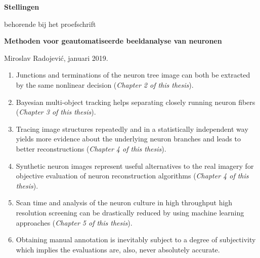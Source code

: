 \documentclass[10pt,a5paper]{report}
\begin{document}
\pagestyle{empty}

\begin{center}
  {\Large\bf Stellingen}

  \medskip

  behorende bij het proefschrift

  \medskip

  {\large\bf  Methoden voor geautomatiseerde beeldanalyse van neuronen}

  \medskip

  Miroslav Radojevi\'{c}, januari 2019.
\end{center}

\bigskip
\small

\begin{enumerate}[leftmargin=2.5mm]
  
\item Junctions and terminations of the neuron tree image can both be extracted by the same nonlinear decision (\emph{Chapter 2 of this thesis}).

\medskip
  
\item Bayesian multi-object tracking helps separating closely running neuron fibers (\emph{Chapter 3 of this thesis}).  

\medskip

\item Tracing image structures repeatedly and in a statistically independent way yields more evidence about the underlying neuron branches and leads to better reconstructions (\emph{Chapter 4 of this thesis}).
	
\medskip

\item Synthetic neuron images represent useful alternatives to the real imagery for objective evaluation of neuron reconstruction algorithms (\emph{Chapter 4 of this thesis}).

\medskip

\item Scan time and analysis of the neuron culture in high throughput high resolution screening can be drastically reduced by using machine learning approaches (\emph{Chapter 5 of this thesis}).

\medskip

\item Obtaining manual annotation is inevitably subject to a degree of subjectivity which implies the evaluations are, also, never absolutely accurate.
 

\end{enumerate}
\end{document}
